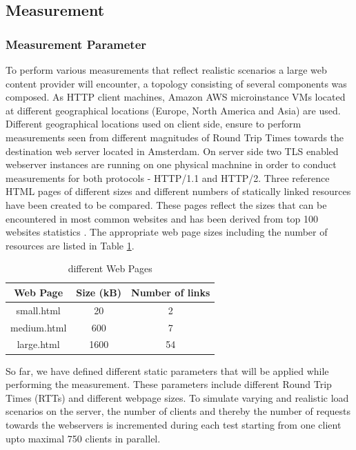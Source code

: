 \subsection{Measurement}
\subsubsection{Measurement Parameter}
\label{subsec:measurements}
To perform various measurements that reflect realistic scenarios a large web content provider will encounter, a topology consisting of several components was composed. As HTTP client machines, Amazon AWS microinstance VMs \cite{amazon} located at different geographical locations (Europe, North America and Asia) are used. Different geographical locations used on client side, ensure to perform measurements seen from different magnitudes of Round Trip Times towards the destination web server located in Amsterdam. On server side two TLS enabled webserver instances are running on one physical machnine in order to conduct measurements for both protocols - HTTP/1.1 and HTTP/2. Three reference HTML pages of different sizes and different numbers of statically linked resources have been created to be compared. These pages reflect the sizes that can be encountered in most common websites and has been derived from top 100 websites statistics \cite{httparchive}. The appropriate web page sizes including the number of resources are listed in Table \ref{table:pages}.

\begin{table}[h]
	\centering
\begin{tabular}{ | c | c | c | }

\hline
\textbf{Web Page} & \textbf{Size (kB)} & \textbf{Number of links}\\ \hline \hline
small.html &  20 & 2 \\ \hline
medium.html &  600 & 7\\ \hline 
large.html &  1600 & 54 \\
\hline
\end{tabular}
\caption{different Web Pages}
\label{table:pages}
\end{table}

So far, we have defined different static parameters that will be applied while performing the measurement. These parameters include different Round Trip Times (RTTs) and different webpage sizes.  
To simulate varying and realistic load scenarios on the server, the number of clients and thereby the number of requests towards the webservers is incremented during each test starting from one client upto maximal 750 clients in parallel.
\\  

